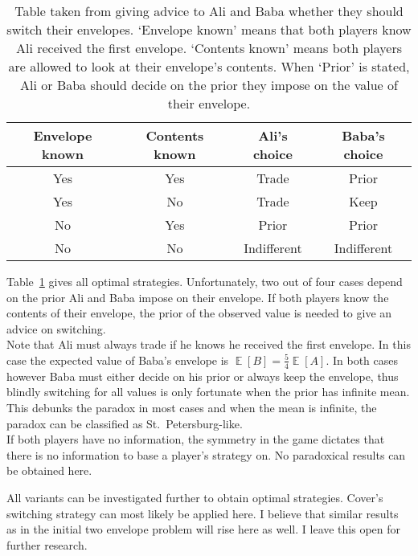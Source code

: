 \documentclass[a4paper]{report}
\theoremstyle{plain}
\theoremstyle{definition}
\theoremstyle{remark}
\numberwithin{equation}{chapter}
\DeclareMathOperator{\E}{\mathbb{E}}
\DeclareMathOperator{\1}{\mathbbm{1}}
\begin{document}
\begin{table}
\begin{center}
\begin{tabular}{cc|cc}
Envelope known&Contents known&Ali's choice&Baba's choice\\\hline
Yes&Yes&Trade&Prior\\
Yes&No&Trade&Keep\\
No&Yes&Prior&Prior\\
No&No&Indifferent&Indifferent
\end{tabular}
\end{center}
\caption{Table taken from \cite{Nickerson06} giving advice to Ali and Baba whether they should switch their envelopes. `Envelope known' means that both players know Ali received the first envelope. `Contents known' means both players are allowed to look at their envelope's contents. When `Prior' is stated, Ali or Baba should decide on the prior they impose on the value of their envelope.}
\label{tbl:alibaba}
\end{table}

Table~\ref{tbl:alibaba} gives all optimal strategies. Unfortunately, two out of four cases depend on the prior Ali and Baba impose on their envelope. If both players know the contents of their envelope, the prior of the observed value is needed to give an advice on switching.\\
Note that Ali must always trade if he knows he received the first envelope. In this case the expected value of Baba's envelope is $\E[B]=\frac{5}{4}\E[A]$. In both cases however Baba must either decide on his prior or always keep the envelope, thus blindly switching for all values is only fortunate when the prior has infinite mean. This debunks the paradox in most cases and when the mean is infinite, the paradox can be classified as St.~Petersburg-like.\\
If both players have no information, the symmetry in the game dictates that there is no information to base a player's strategy on. No paradoxical results can be obtained here.

All variants can be investigated further to obtain optimal strategies. Cover's switching strategy can most likely be applied here. I believe that similar results as in the initial two envelope problem will rise here as well. I leave this open for further research.
\end{document}
